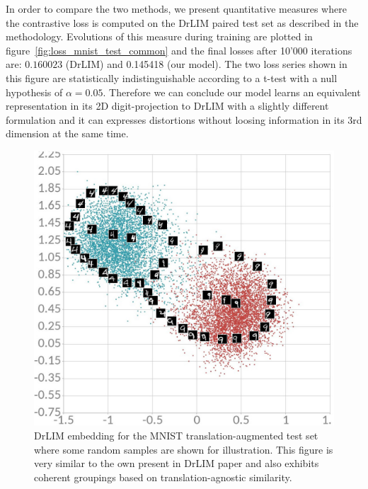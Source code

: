 \documentclass[a4paper,12pt]{report}
\begin{document}
In order to compare the two methods, we present quantitative measures where the contrastive loss is computed on the DrLIM paired test set as described in the methodology.
Evolutions of this measure during training are plotted in figure~\ref{fig:loss_mnist_test_common} and the final losses after 10'000 iterations are: $0.160023$ (DrLIM) and 0.145418 (our model).
The two loss series shown in this figure are statistically indistinguishable according to a t-test with a null hypothesis of $\alpha = 0.05$.
Therefore we can conclude our model learns an equivalent representation in its 2D digit-projection to DrLIM with a slightly different formulation and it can expresses distortions without loosing information in its 3rd dimension at the same time.

\begin{figure}[h]
    \centering
    \includegraphics{thesis_figures/mnist_cl_drlim.jpg}
    \caption{DrLIM embedding for the MNIST translation-augmented test set where some random samples are shown for illustration.
    This figure is very similar to the own present in DrLIM paper and also exhibits coherent groupings based on translation-agnostic similarity.
    }
    \label{fig:mnist_cl_drlim}
\end{figure}
\end{document}
